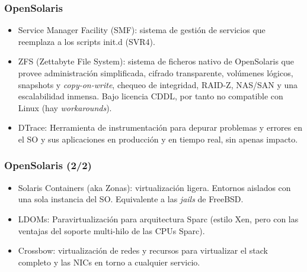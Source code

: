 \documentclass{beamer}
\begin{document}
\begin{frame}
\frametitle{OpenSolaris}

\begin{itemize}
\item \alert{Service Manager Facility} (SMF): sistema de gestión de servicios que reemplaza a los scripts init.d (SVR4).
\item \alert{ZFS} (Zettabyte File System): sistema de ficheros nativo de OpenSolaris que provee administración simplificada, cifrado transparente, volúmenes lógicos, snapshots y \textit{copy-on-write}, chequeo de integridad, RAID-Z, NAS/SAN y una escalabilidad inmensa. Bajo licencia CDDL, por tanto no compatible con Linux (hay \textit{workarounds}).
\item \alert{DTrace:} Herramienta de instrumentación para depurar problemas y errores en el SO y sus aplicaciones en producción y en tiempo real, sin apenas impacto.
\end{itemize}

\end{frame}



\begin{frame}
\frametitle{OpenSolaris (2/2)}

\begin{itemize}
\item \alert{Solaris Containers} (aka \alert{Zonas}): virtualización ligera. Entornos aislados con una sola instancia del SO. Equivalente a las \textit{jails} de FreeBSD.
\item \alert{LDOMs}: Paravirtualización para arquitectura Sparc (estilo Xen, pero con las ventajas del soporte multi-hilo de las CPUs Sparc).
\item \alert{Crossbow}: virtualización de redes y recursos para virtualizar el stack completo y las NICs en torno a cualquier servicio. 
\end{itemize}

\end{frame}




\end{document}
